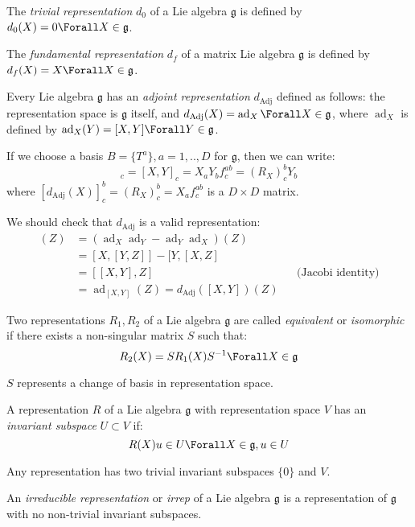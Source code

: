 \documentclass{jknotes}
\begin{document}
\begin{defn}
    The \emph{trivial representation} \(d_0\) of a Lie algebra \(\mathfrak{g}\) is defined by \(d_0(X) = 0 \Forall X \in \mathfrak{g}\).
\end{defn}
\begin{defn}
    The \emph{fundamental representation} \(d_f\) of a matrix Lie algebra \(\mathfrak{g}\) is defined by \(d_f(X) = X \Forall X \in \mathfrak{g}\).
\end{defn}
\begin{defn}
    Every Lie algebra \(\mathfrak{g}\) has an \emph{adjoint representation} \(d_\text{Adj}\) defined as follows: the representation space is \(\mathfrak{g}\) itself, and \(d_\text{Adj}(X) = \operatorname{ad}_X \Forall X \in \mathfrak{g}\), where \(\operatorname{ad}_X\) is defined by \(\operatorname{ad}_X(Y) = [X,Y] \Forall Y \in \mathfrak{g}\).
\end{defn}
If we choose a basis \(B=\{T^a\}, a = 1,..,D\) for \(\mathfrak{g}\), then we can write:
\begin{equation}
    [\operatorname{ad}_X(Y)]_c = [X,Y]_c = X_aY_bf^{ab}_c = (R_X)_c^bY_b
\end{equation}
where \([d_\text{Adj}(X)]_c^b = (R_X)_c^b = X_af^{ab}_c\) is a \(D\times D\) matrix.

We should check that \(d_\text{Adj}\) is a valid representation:
\begin{align}
    [d_\text{Adj}(X),d_\text{Adj}(Y)](Z) &= (\operatorname{ad}_X\operatorname{ad}_Y - \operatorname{ad}_Y\operatorname{ad}_X)(Z) \\
    &= [X,[Y,Z]] - [Y,[X,Z]\\
    &= [[X,Y],Z] && \text{(Jacobi identity)} \\
    &= \operatorname{ad}_{[X,Y]}(Z) = d_\text{Adj}([X,Y])(Z)
\end{align}
\begin{defn}
    Two representations \(R_1, R_2\) of a Lie algebra \(\mathfrak{g}\) are called \emph{equivalent} or \emph{isomorphic} if there exists a non-singular matrix \(S\) such that:
    \begin{equation}
        R_2(X) = SR_1(X)S^{-1} \Forall X \in \mathfrak{g}
    \end{equation}
\end{defn}
\(S\) represents a change of basis in representation space.
\begin{defn}
    A representation \(R\) of a Lie algebra \(\mathfrak{g}\) with representation space \(V\) has an \emph{invariant subspace} \(U \subset V\) if:
    \begin{equation}
        R(X)u \in U \Forall X \in \mathfrak{g}, u \in U
    \end{equation}
\end{defn}
Any representation has two trivial invariant subspaces \(\{0\}\) and \(V\).
\begin{defn}
    An \emph{irreducible representation} or \emph{irrep} of a Lie algebra \(\mathfrak{g}\) is a representation of \(\mathfrak{g}\) with no non-trivial invariant subspaces.
\end{defn}
\end{document}
